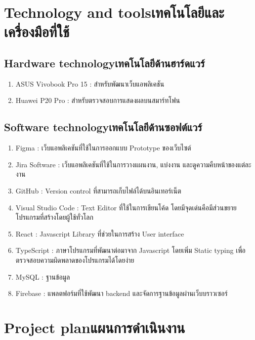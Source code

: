 \section{\ifenglish Technology and tools\else เทคโนโลยีและเครื่องมือที่ใช้\fi}

\subsection{\ifenglish Hardware technology\else เทคโนโลยีด้านฮาร์ดแวร์\fi}
\begin{enumerate}
    \item ASUS Vivobook Pro 15 : สำหรับพัฒนาเว็บแอพลิเคชัน
    \item Huawei P20 Pro : สำหรับตรวจสอบการแสดงผลบนสมาร์ทโฟน
\end{enumerate}
\subsection{\ifenglish Software technology\else เทคโนโลยีด้านซอฟต์แวร์\fi}
\begin{enumerate}
    \item Figma : เว็บแอพลิเคชันที่ใช้ในการออกแบบ Prototype ของเว็บไซต์
    \item Jira Software : เว็บแอพลิเคชันที่ใช้ในการวางแผนงาน, แบ่งงาน และดูความคืบหน้าของแต่ละงาน
    \item GitHub : Version control ที่สามารถเก็บไฟล์ได้บนอินเทอร์เน็ต
    \item Visual Studio Code : Text Editor ที่ใช้ในการเขียนโค้ด โดยมีจุดเด่นคือมีส่วนขยายโปรแกรมที่สร้างโดยผู้ใช้ทั่วโลก
    \item React : Javascript Library ที่ช่วยในการสร้าง User interface
    \item TypeScript : ภาษาโปรแกรมที่พัฒนาต่อมาจาก Javascript โดยเพิ่ม Static typing เพื่อตรวจสอบความผิดพลาดของโปรแกรมได้โดยง่าย
    \item MySQL : ฐานข้อมูล
    \item Firebase : แพลตฟอร์มที่ใช้พัฒนา backend และจัดการฐานข้อมูลผ่านเว็บบราวเซอร์
\end{enumerate}
\section{\ifenglish Project plan\else แผนการดำเนินงาน\fi}

